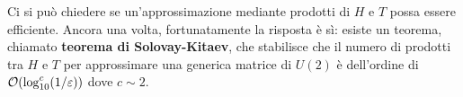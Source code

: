 \begin{enumerate}
    \noindent Ci si può chiedere se un'approssimazione mediante prodotti di $H$ e $T$ possa essere efficiente. Ancora una volta, fortunatamente la risposta è sì: esiste un teorema, chiamato \textbf{teorema di Solovay-Kitaev}, che stabilisce che il numero di prodotti tra $H$ e $T$ per approssimare una generica matrice di $U(2)$ è dell'ordine di $\order{\log_{10}^c(1/\varepsilon)}$ dove $c \sim 2$. 
    
\end{enumerate}
